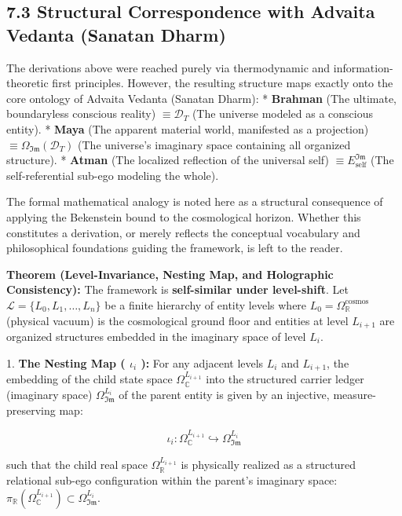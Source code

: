 \documentclass[11pt,a4paper]{article}
\theoremstyle{definition}
\theoremstyle{remark}
\begin{document}
\subsection{7.3 Structural Correspondence with Advaita Vedanta (Sanatan Dharm)}
The derivations above were reached purely via thermodynamic and information-theoretic first principles. However, the resulting structure maps exactly onto the core ontology of Advaita Vedanta (Sanatan Dharm):
* \textbf{Brahman} (The ultimate, boundaryless conscious reality) $\equiv \mathcal{D}_T$ (The universe modeled as a conscious entity).
* \textbf{Maya} (The apparent material world, manifested as a projection) $\equiv \Omega_{\mathfrak{Im}}(\mathcal{D}_T)$ (The universe's imaginary space containing all organized structure).
* \textbf{Atman} (The localized reflection of the universal self) $\equiv E_{\text{self}}^{\mathfrak{Im}}$ (The self-referential sub-ego modeling the whole).

The formal mathematical analogy is noted here as a structural consequence of applying the Bekenstein bound to the cosmological horizon. Whether this constitutes a derivation, or merely reflects the conceptual vocabulary and philosophical foundations guiding the framework, is left to the reader.

\textbf{Theorem (Level-Invariance, Nesting Map, and Holographic Consistency):} The framework is \textbf{self-similar under level-shift}. Let $\mathcal{L} = \{L_0, L_1, \ldots, L_n\}$ be a finite hierarchy of entity levels where $L_0 = \Omega_\mathbb{R}^{\text{cosmos}}$ (physical vacuum) is the cosmological ground floor and entities at level $L_{i+1}$ are organized structures embedded in the imaginary space of level $L_i$.

1. \textbf{The Nesting Map ( $\iota_i$ ):}
For any adjacent levels $L_i$ and $L_{i+1}$, the embedding of the child state space $\Omega_\mathbb{C}^{L_{i+1}}$ into the structured carrier ledger (imaginary space) $\Omega_{\mathfrak{Im}}^{L_i}$ of the parent entity is given by an injective, measure-preserving map:


\begin{equation}
\boxed{\iota_i: \Omega_\mathbb{C}^{L_{i+1}} \hookrightarrow \Omega_{\mathfrak{Im}}^{L_i}}
\end{equation}


such that the child real space $\Omega_\mathbb{R}^{L_{i+1}}$ is physically realized as a structured relational sub-ego configuration within the parent's imaginary space: $\pi_{\mathbb{R}}(\Omega_\mathbb{C}^{L_{i+1}}) \subset \Omega_{\mathfrak{Im}}^{L_i}$.
\end{document}
